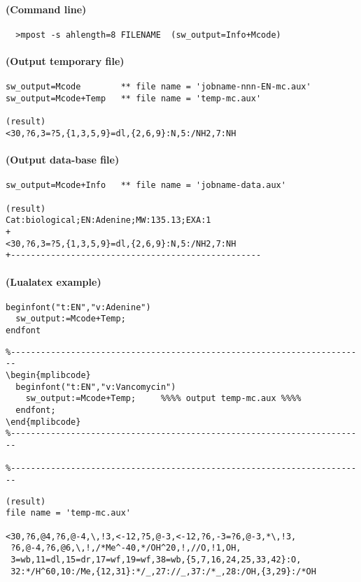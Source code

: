 \documentclass[a4paper]{article}
\begin{document}
\paragraph{(Command line)}
\begin{verbatim}
  >mpost -s ahlength=8 FILENAME  (sw_output=Info+Mcode)
\end{verbatim}
\paragraph{(Output temporary file)}
\begin{verbatim}
sw_output=Mcode        ** file name = 'jobname-nnn-EN-mc.aux'
sw_output=Mcode+Temp   ** file name = 'temp-mc.aux'

(result)
<30,?6,3=?5,{1,3,5,9}=dl,{2,6,9}:N,5:/NH2,7:NH

\end{verbatim}
\paragraph{(Output data-base file)}
\begin{verbatim}
sw_output=Mcode+Info   ** file name = 'jobname-data.aux'

(result)
Cat:biological;EN:Adenine;MW:135.13;EXA:1
+
<30,?6,3=?5,{1,3,5,9}=dl,{2,6,9}:N,5:/NH2,7:NH
+--------------------------------------------------

\end{verbatim}
\paragraph{(Lualatex example)}
\begin{verbatim}
beginfont("t:EN","v:Adenine")
  sw_output:=Mcode+Temp;
endfont
\end{verbatim}
\begin{verbatim}
%-----------------------------------------------------------------------
\begin{mplibcode}
  beginfont("t:EN","v:Vancomycin")
    sw_output:=Mcode+Temp;     %%%% output temp-mc.aux %%%%
  endfont;
\end{mplibcode}
%-----------------------------------------------------------------------

%-----------------------------------------------------------------------
\end{verbatim}
\begin{verbatim}
(result)
file name = 'temp-mc.aux'

<30,?6,@4,?6,@-4,\,!3,<-12,?5,@-3,<-12,?6,-3=?6,@-3,*\,!3,
 ?6,@-4,?6,@6,\,!,/*Me^-40,*/OH^20,!,//O,!1,OH,
 3=wb,11=dl,15=dr,17=wf,19=wf,38=wb,{5,7,16,24,25,33,42}:O,
 32:*/H^60,10:/Me,{12,31}:*/_,27://_,37:/*_,28:/OH,{3,29}:/*OH
\end{verbatim}
\newpage
\noindent%
\end{document}
